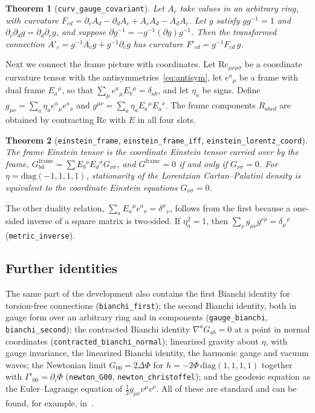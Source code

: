 \documentclass[pdflatex,sn-mathphys-num]{sn-jnl}%
\theoremstyle{thmstyleone}%
\newtheorem{theorem}{Theorem}%
\theoremstyle{thmstyletwo}%
\theoremstyle{thmstylethree}%
\newcommand{\lean}[1]{\texttt{#1}}
\begin{document}
\begin{theorem}[\lean{curv\_gauge\_covariant}]\label{thm:gauge}
Let $A_c$ take values in an arbitrary ring, with curvature $F_{cd}=\partial_cA_d-\partial_dA_c+A_cA_d-A_dA_c$. Let $g$ satisfy $gg^{-1}=1$ and $\partial_c\partial_dg=\partial_d\partial_cg$, and suppose $\partial g^{-1}=-g^{-1}(\partial g)g^{-1}$. Then the transformed connection $A'_c=g^{-1}A_cg+g^{-1}\partial_cg$ has curvature $F'_{cd}=g^{-1}F_{cd}\,g$.
\end{theorem}

Next we connect the frame picture with coordinates. Let $\mathrm{Rc}_{\mu\nu\rho\sigma}$ be a coordinate curvature tensor with the antisymmetries~\eqref{eq:antisym}, let $e^a{}_\mu$ be a frame with dual frame $E_a{}^\mu$, so that $\sum_\mu e^a{}_\mu E_b{}^\mu=\delta_{ab}$, and let $\eta_a$ be signs. Define $g_{\mu\nu}=\sum_a\eta_ae^a{}_\mu e^a{}_\nu$ and $g^{\mu\nu}=\sum_a\eta_aE_a{}^\mu E_a{}^\nu$. The frame components $R_{abcd}$ are obtained by contracting $\mathrm{Rc}$ with $E$ in all four slots.

\begin{theorem}[\lean{einstein\_frame}, \lean{einstein\_frame\_iff}, \lean{einstein\_lorentz\_coord}]\label{thm:frame}
The frame Einstein tensor is the coordinate Einstein tensor carried over by the frame, $G^{\mathrm{frame}}_{bd}=\sum E_b{}^\nu E_d{}^\sigma G_{\nu\sigma}$, and $G^{\mathrm{frame}}=0$ if and only if $G_{\nu\sigma}=0$. For $\eta=\mathrm{diag}(-1,1,1,1)$, stationarity of the Lorentzian Cartan--Palatini density is equivalent to the coordinate Einstein equations $G_{\nu\sigma}=0$.
\end{theorem}

The other duality relation, $\sum_aE_a{}^\mu e^a{}_\nu=\delta^\mu{}_\nu$, follows from the first because a one-sided inverse of a square matrix is two-sided. If $\eta_a^2=1$, then $\sum_\nu g_{\mu\nu}g^{\nu\rho}=\delta_\mu{}^\rho$ (\lean{metric\_inverse}).

\subsection{Further identities}\label{subsec:further}

The same part of the development also contains the first Bianchi identity for torsion-free connections (\lean{bianchi\_first}); the second Bianchi identity, both in gauge form over an arbitrary ring and in components (\lean{gauge\_bianchi}, \lean{bianchi\_second}); the contracted Bianchi identity $\nabla^aG_{ab}=0$ at a point in normal coordinates (\lean{contracted\_bianchi\_normal}); linearized gravity about $\eta$, with gauge invariance, the linearized Bianchi identity, the harmonic gauge and vacuum waves; the Newtonian limit $G_{00}=2\Delta\Phi$ for $h=-2\Phi\,\mathrm{diag}(1,1,1,1)$ together with $\Gamma^i{}_{00}=\partial_i\Phi$ (\lean{newton\_G00}, \lean{newton\_christoffel}); and the geodesic equation as the Euler--Lagrange equation of $\tfrac12g_{\mu\nu}v^\mu v^\nu$. All of these are standard and can be found, for example, in~\cite{Wald1984}.
\end{document}

